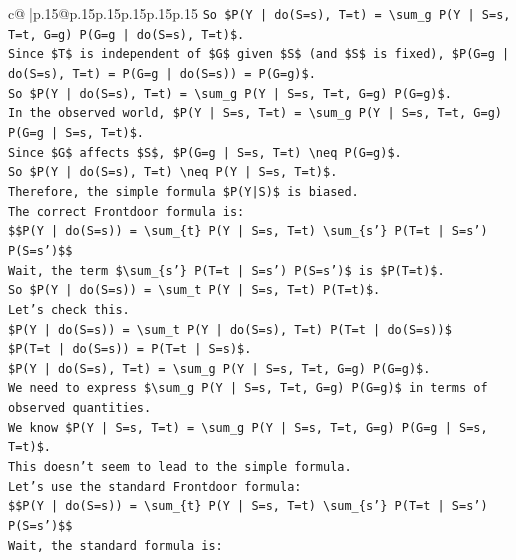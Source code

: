 \documentclass{article}
\begin{document}
{\begin{supertabular}{c@{$\;$}|p{.15\linewidth}@{}p{.15\linewidth}p{.15\linewidth}p{.15\linewidth}p{.15\linewidth}p{.15\linewidth}}
{{{\texttt{So \$P(Y | do(S=s), T=t) = \textbackslash{}sum\_g P(Y | S=s, T=t, G=g) P(G=g | do(S=s), T=t)\$.} \\
\texttt{Since \$T\$ is independent of \$G\$ given \$S\$ (and \$S\$ is fixed), \$P(G=g | do(S=s), T=t) = P(G=g | do(S=s)) = P(G=g)\$.} \\
\texttt{So \$P(Y | do(S=s), T=t) = \textbackslash{}sum\_g P(Y | S=s, T=t, G=g) P(G=g)\$.} \\
\texttt{In the observed world, \$P(Y | S=s, T=t) = \textbackslash{}sum\_g P(Y | S=s, T=t, G=g) P(G=g | S=s, T=t)\$.} \\
\texttt{Since \$G\$ affects \$S\$, \$P(G=g | S=s, T=t) \textbackslash{}neq P(G=g)\$.} \\
\texttt{So \$P(Y | do(S=s), T=t) \textbackslash{}neq P(Y | S=s, T=t)\$.} \\
\texttt{Therefore, the simple formula \$P(Y|S)\$ is biased.} \\
\texttt{The correct Frontdoor formula is:} \\
\texttt{\$\$P(Y | do(S=s)) = \textbackslash{}sum\_\{t\} P(Y | S=s, T=t) \textbackslash{}sum\_\{s'\} P(T=t | S=s') P(S=s')\$\$} \\
\texttt{Wait, the term \$\textbackslash{}sum\_\{s'\} P(T=t | S=s') P(S=s')\$ is \$P(T=t)\$.} \\
\texttt{So \$P(Y | do(S=s)) = \textbackslash{}sum\_t P(Y | S=s, T=t) P(T=t)\$.} \\
\texttt{Let's check this.} \\
\texttt{\$P(Y | do(S=s)) = \textbackslash{}sum\_t P(Y | do(S=s), T=t) P(T=t | do(S=s))\$} \\
\texttt{\$P(T=t | do(S=s)) = P(T=t | S=s)\$.} \\
\texttt{\$P(Y | do(S=s), T=t) = \textbackslash{}sum\_g P(Y | S=s, T=t, G=g) P(G=g)\$.} \\
\texttt{We need to express \$\textbackslash{}sum\_g P(Y | S=s, T=t, G=g) P(G=g)\$ in terms of observed quantities.} \\
\texttt{We know \$P(Y | S=s, T=t) = \textbackslash{}sum\_g P(Y | S=s, T=t, G=g) P(G=g | S=s, T=t)\$.} \\
\texttt{This doesn't seem to lead to the simple formula.} \\
\texttt{Let's use the standard Frontdoor formula:} \\
\texttt{\$\$P(Y | do(S=s)) = \textbackslash{}sum\_\{t\} P(Y | S=s, T=t) \textbackslash{}sum\_\{s'\} P(T=t | S=s') P(S=s')\$\$} \\
\texttt{Wait, the standard formula is:} \\
}}}
\end{supertabular}}
\end{document}
